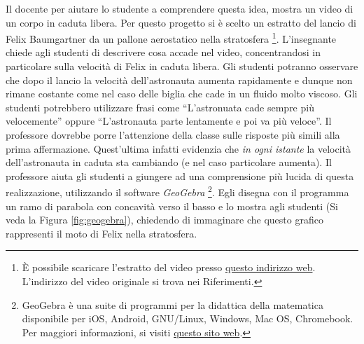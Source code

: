 \documentclass{report} \usepackage[T1]{fontenc} \usepackage[italian]{babel}
\begin{document}
Il docente per aiutare lo studente a comprendere questa idea,
mostra un video di un corpo in caduta libera. Per questo progetto
si è scelto un estratto del lancio di Felix Baumgartner da un
pallone aerostatico nella stratosfera
\footnote{
          \`E possibile scaricare l'estratto del video presso
          \textcolor{blue}{\href{https://github.com/savaroskij/PED1/blob/master/progetto_finale/media/video/felix_baumgartner.mp4?raw=true}{questo indirizzo web}}.
          L'indirizzo del video originale si trova nei Riferimenti\cite{felix}.
         }.
L'insegnante chiede agli studenti di descrivere cosa accade nel
video, concentrandosi in particolare sulla velocità di Felix in caduta
libera. Gli studenti potranno osservare che dopo il lancio la velocità
dell'astronauta aumenta rapidamente e dunque non rimane costante come nel
caso delle biglia che cade in un fluido molto viscoso.
Gli studenti potrebbero utilizzare frasi come ``L'astronuata cade
sempre più velocemente'' oppure ``L'astronauta parte
lentamente e poi va più veloce''.
Il professore dovrebbe porre l'attenzione della classe sulle
risposte più simili alla prima affermazione. Quest'ultima
infatti evidenzia che \emph{in ogni istante} la velocità
dell'astronauta in caduta sta cambiando (e nel caso particolare aumenta).
Il professore aiuta gli studenti a giungere ad una comprensione
più lucida di questa realizzazione, utilizzando il software
\emph{GeoGebra}
\footnote{
          GeoGebra è una suite di programmi per la didattica della matematica
          disponibile per iOS, Android, GNU/Linux, Windows, Mac OS, Chromebook.
          Per maggiori informazioni, si visiti
          \textcolor{blue}{\href{https://www.geogebra.org/}{questo sito web}}.
         }.
Egli disegna con il programma un ramo di parabola con concavità
verso il basso e lo mostra agli studenti (Si veda la Figura
\ref{fig:geogebra}), chiedendo di immaginare che questo grafico
rappresenti il moto di Felix nella stratosfera.
\end{document}
